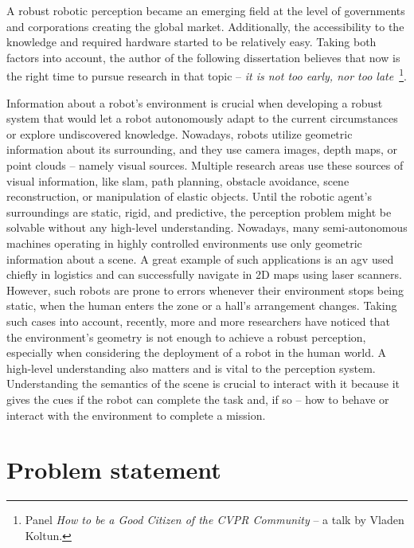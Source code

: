 \documentclass[a4paper, 10pt, twoside]{report}
\begin{document}
A robust robotic perception became an emerging field at the level of governments and corporations creating the global market. Additionally, the accessibility to the knowledge and required hardware started to be relatively easy. Taking both factors into account, the author of the following dissertation believes that now is the right time to pursue research in that topic -- \textit{it is not too early, nor too late}~\footnote{Panel \textit{How to be a Good Citizen of the CVPR Community} -- a talk by Vladen Koltun.}.

Information about a robot's environment is crucial when developing a robust system that would let a robot autonomously adapt to the current circumstances or explore undiscovered knowledge. Nowadays, robots utilize geometric information about its surrounding, and they use camera images, depth maps, or point clouds -- namely visual sources. Multiple research areas use these sources of visual information, like \acrfull{slam}, path planning, obstacle avoidance, scene reconstruction, or manipulation of elastic objects. Until the robotic agent's surroundings are static, rigid, and predictive, the perception problem might be solvable without any high-level understanding. Nowadays, many semi-autonomous machines operating in highly controlled environments use only geometric information about a scene. A great example of such applications is an \acrfull{agv} used chiefly in logistics and can successfully navigate in 2D maps using laser scanners. However, such robots are prone to errors whenever their environment stops being static, \eg when the human enters the zone or a hall's arrangement changes. Taking such cases into account, recently, more and more researchers have noticed that the environment's geometry is not enough to achieve a robust perception, especially when considering the deployment of a robot in the human world. A high-level understanding also matters and is vital to the perception system. Understanding the semantics of the scene is crucial to interact with it because it gives the cues if the robot can complete the task and, if so -- how to behave or interact with the environment to complete a mission.

\section{Problem statement}
\label{part:introduction:problem}
\end{document}
